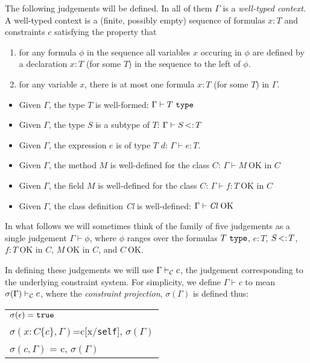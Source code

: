\documentclass[preprint,nocopyrightspace,9pt]{sigplanconf}
\def\self{\mbox{\tt self}}
\begin{document}
The following judgements will be defined. In all of them $\Gamma$ is a
{\em well-typed context}. A well-typed context is a (finite, possibly
empty) sequence of formulas $x:T$ and constraints $c$ satisfying the
property that
\begin{enumerate}
  \item for any formula $\phi$ in the sequence all variables $x$
    occuring in $\phi$ are defined by a declaration $x:T$ (for some $T$)
    in the sequence to the left of $\phi$.
  \item for any variable $x$, there is at most one formula $x:T$ (for
  some $T$) in $\Gamma$.
\end{enumerate}


\begin{itemize}
  \item Given $\Gamma$, the type $T$ is well-formed: $\Gamma \vdash T
  \ {\tt type}$
  \item Given $\Gamma$, the type $S$ is a subtype of $T$: $\Gamma \vdash S \subtype T$
  \item Given $\Gamma$, the expression $e$ is of type $T$ 
   $d$: $\Gamma \vdash e:T$.

  \item Given $\Gamma$, the method $M$ is well-defined for the class $C$: 
  $\Gamma \vdash M\ \mbox{OK in $C$}$
  \item Given $\Gamma$, the field $M$ is well-defined for the class $C$:
    $\Gamma \vdash f:T\ \mbox{OK in $C$}$
  \item Given $\Gamma$, the class definition \mbox{\em Cl} is well-defined: $\Gamma \vdash \mbox{{\em Cl}\ OK}$
\end{itemize}


In what follows we will sometimes think of the family of five
judgements as a single judgement $\Gamma \vdash \phi$, where $\phi$
ranges over the formulas $T\ \tt type$, $e:T$, $S \subtype T$, $f:T\
\mbox{OK in $C$}$, $M\ \mbox{OK in $C$}$, and $C\ \mbox{OK}$.

In defining these judgements we will use $\Gamma \vdash_{\cal C} c$,
the judgement corresponding to the underlying constraint system. For simplicity,
we define $\Gamma \vdash c$ to mean $\sigma(\Gamma)\vdash_{\cal C} c$,
where the {\em constraint projection}, $\sigma(\Gamma)$ is defined thus:

\begin{tabular}{l}
$\sigma(\epsilon)={\tt true}$\\
$\sigma(x:C\{c\}, \Gamma)$=c[x/\self], $\sigma(\Gamma)$\\
$\sigma(c,\Gamma)$ = c, $\sigma(\Gamma)$
\end{tabular}
\end{document}
